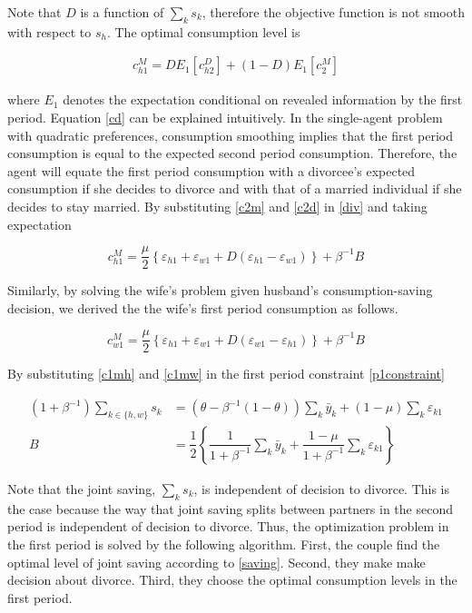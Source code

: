 Note that $D$ is a function of $\sum_k s_k$, therefore the objective function is not smooth with respect to $s_h$. The optimal consumption level is

\begin{align}
c^M_{h1} = D E_1[c^D_{h2}] + (1-D) E_1[c_2^M]  \label{cd}
\end{align}

where $E_1$ denotes the expectation conditional on revealed information by the first period.  Equation \eqref{cd} can be explained intuitively. In the single-agent problem with quadratic preferences, consumption smoothing implies that the first period consumption is equal to the expected second period consumption. Therefore, the agent will equate the first period consumption with a divorcee's expected consumption if she decides to divorce and with that of a married individual if she decides to stay married.  By substituting \eqref{c2m} and \eqref{c2d}  in \eqref {div} and taking expectation

\begin{equation}
c^M_{h1} = \dfrac{ \mu}{2}   \left \{ \varepsilon_{h1} + \varepsilon_{w1} + D (\varepsilon_{h1} - \varepsilon_{w1})  \right \} + \beta^{-1} B
\label{c1mh}
\end{equation}

Similarly, by solving the wife's problem given husband's consumption-saving decision, we derived the the wife's first period consumption as follows. 

\begin{equation}
c^M_{w1} = \dfrac{ \mu}{2}   \left \{ \varepsilon_{h1} + \varepsilon_{w1} + D (\varepsilon_{w1} - \varepsilon_{h1})  \right \} + \beta^{-1} B
\label{c1mw}
\end{equation}

By substituting \eqref{c1mh} and \eqref{c1mw} in the first period constraint \eqref{p1constraint}

\begin {align}
(1 + \beta^{-1}) \sum_{k \in \{h,w\}} s_k  &=  \left (\theta - \beta^{-1} (1- \theta)  \right ) \sum_k \bar y_k + \left ( 1 - \mu \right ) \sum_k \varepsilon_{k1} \\
B & = \dfrac{1}{2} \left \{ \dfrac {1}{1 + \beta^{-1}}\sum_k \bar y_k + \dfrac{ 1 - \mu}{1 + \beta^{-1}}  \sum_k \varepsilon_{k1} \right \} 
\label {saving}
\end{align}


Note that the joint saving, \( \sum_k s_k\), is independent of decision to divorce. This is the case because the way that joint saving splits between partners in the second period is independent of decision to divorce. Thus, the optimization problem in the first period is solved by the following algorithm. First, the couple find the optimal level of joint saving according to \eqref{saving}. Second, they make make decision about divorce. Third, they choose the optimal consumption levels in the first period. \\

